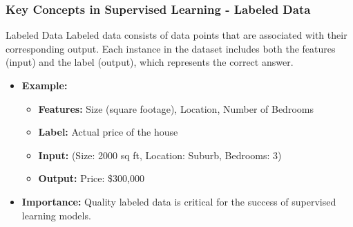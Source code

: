 \documentclass[aspectratio=169]{beamer}
\begin{document}
\begin{frame}[fragile]
    \frametitle{Key Concepts in Supervised Learning - Labeled Data}
    \begin{block}{Labeled Data}
        Labeled data consists of data points that are associated with their corresponding output. Each instance in the dataset includes both the features (input) and the label (output), which represents the correct answer.
    \end{block}
    
    \begin{itemize}
        \item \textbf{Example:} 
        \begin{itemize}
            \item \textbf{Features:} Size (square footage), Location, Number of Bedrooms
            \item \textbf{Label:} Actual price of the house
            \item \textbf{Input:} (Size: 2000 sq ft, Location: Suburb, Bedrooms: 3)
            \item \textbf{Output:} Price: \$300,000
        \end{itemize}
        \item \textbf{Importance:} Quality labeled data is critical for the success of supervised learning models.
    \end{itemize}
\end{frame}
\end{document}
